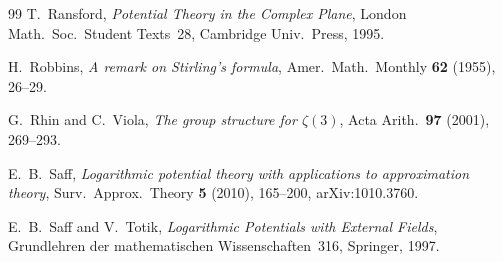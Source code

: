 \documentclass[11pt]{article}
\theoremstyle{remark}
\begin{document}
\begin{thebibliography}{99}
 T.~Ransford, \emph{Potential Theory in the Complex Plane}, London Math.\ Soc.\ Student Texts~28, Cambridge Univ.\ Press, 1995.

 H.~Robbins, \emph{A remark on Stirling's formula}, Amer.\ Math.\ Monthly \textbf{62} (1955), 26--29.

 G.~Rhin and C.~Viola, \emph{The group structure for $\zeta(3)$}, Acta Arith.\ \textbf{97} (2001), 269--293.

 E.~B.~Saff, \emph{Logarithmic potential theory with applications to approximation theory}, Surv.\ Approx.\ Theory \textbf{5} (2010), 165--200, arXiv:1010.3760.

 E.~B.~Saff and V.~Totik, \emph{Logarithmic Potentials with External Fields}, Grundlehren der mathematischen Wissenschaften~316, Springer, 1997.

\end{thebibliography}
\end{document}
